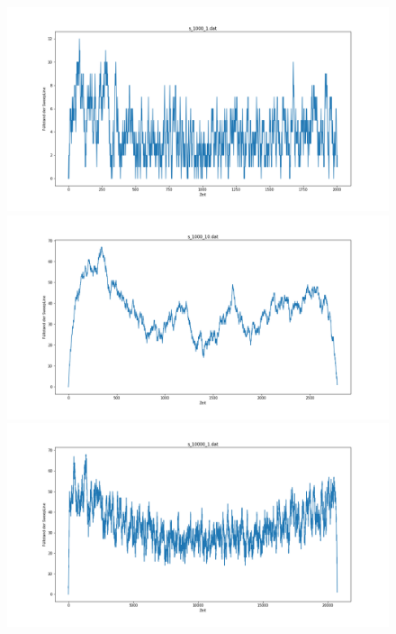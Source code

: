 \documentclass[conference]{IEEEtran}
\begin{document}
	\begin{figure}[!tbp]
		\centering
		\begin{minipage}[b]{0.5\textwidth}
			\includegraphics[width=\textwidth]{s1000+1.png}
		\end{minipage}
		\hfill
		\begin{minipage}[b]{0.5\textwidth}
			\includegraphics[width=\textwidth]{s1000+10.png}
		\end{minipage}
		\hfill
		\begin{minipage}[b]{0.5\textwidth}
			\includegraphics[width=\textwidth]{s10000+1.png}

\end{minipage}
\end{figure}
\end{document}
